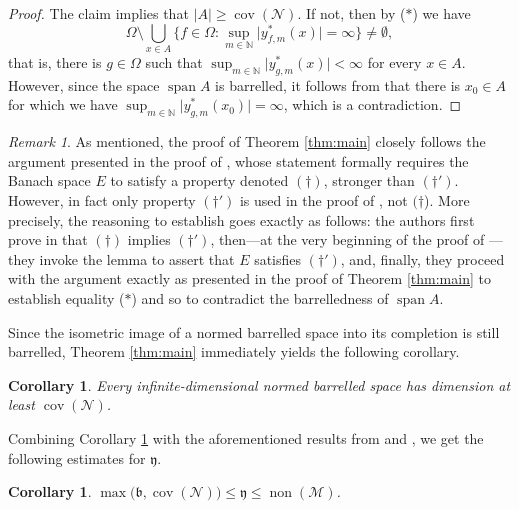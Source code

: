\documentclass[a4paper,11pt,fleqn]{amsart}
\newtheorem{corollary}[theorem]{Corollary}
\theoremstyle{definition}
\theoremstyle{remark}
\newtheorem{remark}[theorem]{Remark}
\numberwithin{equation}{section}
\newcommand{\frakb}{\mathfrak{b}}
\newcommand{\fraky}{\mathfrak{y}}
\newcommand{\N}{\mathbb{N}}
\newcommand{\mM}{\mathcal{M}}
\newcommand{\nN}{\mathcal{N}}
\DeclareMathOperator{\cov}{cov}
\DeclareMathOperator{\non}{non}
\newcommand{\sm}{\setminus}
\DeclareMathOperator{\spn}{span}
\begin{document}
\begin{proof}
    The claim implies that $|A|\ge\cov(\nN)$. If not, then by ($*$) %
    we have
    \[\Omega\sm\bigcup_{x\in A}\Big\{f\in\Omega\colon \sup_{m\in\N}\big|y_{f,m}^*(x)\big|=\infty\Big\}\neq\emptyset,\]
    that is, there is $g\in\Omega$ such that $\sup_{m\in\N}\big|y_{g,m}^*(x)\big|<\infty$ for every $x\in A$. However, since the space $\spn A$ is barrelled, it follows from  \cite[Lemma 4.1]{BS24} that there is $x_0\in A$ for which we have $\sup_{m\in\N}\big|y_{g,m}^*(x_0)\big|=\infty$, which is a contradiction.
\end{proof}

\begin{remark}\label{rem:on_proofs}
As mentioned, the proof of Theorem \ref{thm:main} closely follows the argument presented in the proof of \cite[Theorem 4.9]{BS24}, whose statement formally requires the Banach space $E$ to satisfy a property denoted $(\dagger)$, stronger than $(\dagger')$. However, in fact only property $(\dagger')$ is used in the proof of \cite[Theorem 4.9]{BS24}, not $(\dagger$). More precisely, the reasoning to establish \cite[Theorem 4.9]{BS24} goes exactly as follows: the authors first prove in \cite[Lemma 4.8]{BS24} that $(\dagger)$ implies $(\dagger')$, then---at the very beginning of the proof of \cite[Theorem 4.9]{BS24}---they invoke the lemma to assert that $E$ satisfies $(\dagger')$, and, finally, they proceed with the argument exactly as presented in the proof of Theorem \ref{thm:main} to establish equality ($*$) and so to contradict the barrelledness of $\spn A$.
\end{remark}

Since the isometric image of a normed barrelled space into its completion is still barrelled, Theorem \ref{thm:main} immediately yields the following corollary.

\begin{corollary}\label{cor:covN}
    Every infinite-dimensional normed barrelled space has dimension at least $\cov(\nN)$.
\end{corollary}

Combining Corollary \ref{cor:covN} with the aforementioned results from \cite{BS24} and \cite{SRS95}, we get the following estimates for $\fraky$.

\begin{corollary}\label{cor:y_covN}
    $\max\!\big(\frakb,\cov(\nN)\big)\le\fraky\le\non(\mM)$.
\end{corollary}
\end{document}
